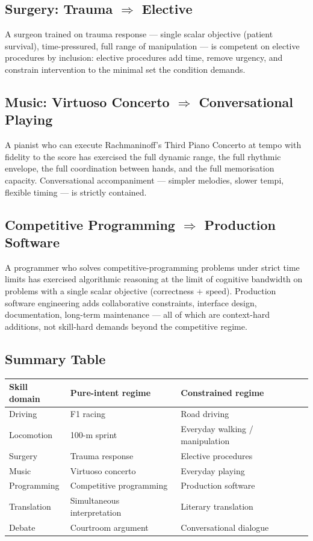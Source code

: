 \documentclass[11pt,twocolumn,a4paper]{article}
\begin{document}
\subsection{Surgery: Trauma $\Rightarrow$ Elective}

A surgeon trained on trauma response --- single scalar objective (patient survival), time-pressured, full range of manipulation --- is competent on elective procedures by inclusion: elective procedures add time, remove urgency, and constrain intervention to the minimal set the condition demands.

\subsection{Music: Virtuoso Concerto $\Rightarrow$ Conversational Playing}

A pianist who can execute Rachmaninoff's Third Piano Concerto at tempo with fidelity to the score has exercised the full dynamic range, the full rhythmic envelope, the full coordination between hands, and the full memorisation capacity. Conversational accompaniment --- simpler melodies, slower tempi, flexible timing --- is strictly contained.

\subsection{Competitive Programming $\Rightarrow$ Production Software}

A programmer who solves competitive-programming problems under strict time limits has exercised algorithmic reasoning at the limit of cognitive bandwidth on problems with a single scalar objective (correctness + speed). Production software engineering adds collaborative constraints, interface design, documentation, long-term maintenance --- all of which are context-hard additions, not skill-hard demands beyond the competitive regime.

\subsection{Summary Table}

\begin{center}
\begin{tabular}{lll}
\toprule
\textbf{Skill domain} & \textbf{Pure-intent regime} & \textbf{Constrained regime} \\
\midrule
Driving & F1 racing & Road driving \\
Locomotion & 100-m sprint & Everyday walking / manipulation \\
Surgery & Trauma response & Elective procedures \\
Music & Virtuoso concerto & Everyday playing \\
Programming & Competitive programming & Production software \\
Translation & Simultaneous interpretation & Literary translation \\
Debate & Courtroom argument & Conversational dialogue \\
\bottomrule
\end{tabular}
\end{center}
\end{document}
